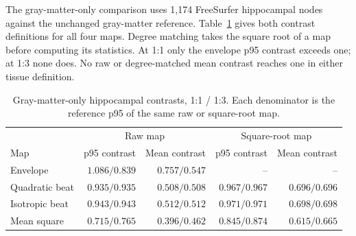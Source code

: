 The gray-matter-only comparison uses 1,174 FreeSurfer hippocampal nodes
against the unchanged gray-matter reference. Table~\ref{tab:fem-gm-contrasts}
gives both contrast definitions for all four maps. Degree matching takes
the square root of a map before computing its statistics. At 1:1 only the
envelope p95 contrast exceeds one; at 1:3 none does. No raw or degree-matched
mean contrast reaches one in either tissue definition.

\begin{table}[htbp]\centering\small
\caption{Gray-matter-only hippocampal contrasts, 1:1 / 1:3. Each denominator
is the reference p95 of the same raw or square-root map.}
\label{tab:fem-gm-contrasts}
\setlength{\tabcolsep}{4pt}
\begin{tabular}{@{}lrrrr@{}}
\toprule
& \multicolumn{2}{c}{Raw map} & \multicolumn{2}{c}{Square-root map}\\
Map & p95 contrast & Mean contrast & p95 contrast & Mean contrast\\
\midrule
Envelope & $1.086/0.839$ & $0.757/0.547$ & -- & --\\
Quadratic beat & $0.935/0.935$ & $0.508/0.508$ & $0.967/0.967$ & $0.696/0.696$\\
Isotropic beat & $0.943/0.943$ & $0.512/0.512$ & $0.971/0.971$ & $0.698/0.698$\\
Mean square & $0.715/0.765$ & $0.396/0.462$ & $0.845/0.874$ & $0.615/0.665$\\
\bottomrule
\end{tabular}
\end{table}
